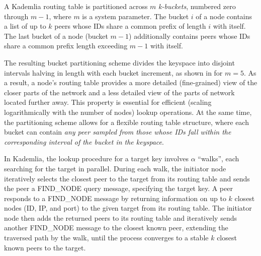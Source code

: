 A Kademlia routing table is partitioned across $m$ \textit{k-buckets}, numbered zero through $m-1$, where $m$ is a system parameter. The bucket $i$ of a node contains a list of up to $k$ peers whose IDs share a common prefix of length $i$ with itself. The last bucket of a node (\ie bucket $m-1$) additionally contains peers whose IDs share a common prefix length exceeding $m-1$ with itself. %



The resulting bucket partitioning scheme divides the keyspace into disjoint intervals halving in length with each bucket increment, as shown in  for $m=5$. As a result, a node's routing table provides a more detailed (\ie fine-grained) view of the closer parts of the network and a less detailed view of the parts of network located further away. This property is essential for efficient (\ie scaling logarithmically with the number of nodes) lookup operations. At the same time, the partitioning scheme allows for a flexible routing table structure, where each bucket can contain \textit{any peer sampled from those whose IDs fall within the corresponding interval of the bucket in the keyspace}.

In Kademlia, the lookup procedure for a target key involves $\alpha$ ``walks'', each searching for the target in parallel. During each walk, the initiator node iteratively selects the closest peer to the target from its routing table and sends the peer a FIND\_NODE query message, specifying the target key. A peer responds to a FIND\_NODE message by returning information on up to $k$ closest nodes (\ie ID, IP, and port) to the given target from its routing table. The initiator node then adds the returned peers to its routing table and iteratively sends another FIND\_NODE message to the closest known peer, extending the traversed path by the walk, until the process converges to a stable $k$ closest known peers to the target. %

